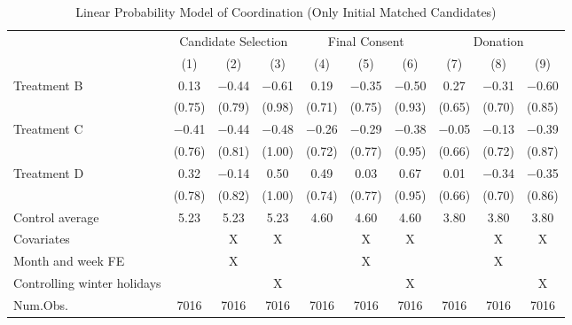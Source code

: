 \documentclass[12pt, a4paper]{article}
\begin{document}
\begin{table}[H]

\caption{\label{tab:lm-coordinate-initial-matched}Linear Probability Model of Coordination (Only Initial Matched Candidates)}
\centering
\fontsize{8}{10}\selectfont
\begin{threeparttable}
\begin{tabular}[t]{lccccccccc}
\toprule
\multicolumn{1}{c}{ } & \multicolumn{3}{c}{Candidate Selection} & \multicolumn{3}{c}{Final Consent} & \multicolumn{3}{c}{Donation} \\
\cmidrule(l{3pt}r{3pt}){2-4} \cmidrule(l{3pt}r{3pt}){5-7} \cmidrule(l{3pt}r{3pt}){8-10}
  & (1) & (2) & (3) & (4) & (5) & (6) & (7) & (8) & (9)\\
\midrule
Treatment B & \num{0.13} & \num{-0.44} & \num{-0.61} & \num{0.19} & \num{-0.35} & \num{-0.50} & \num{0.27} & \num{-0.31} & \num{-0.60}\\
 & (\num{0.75}) & (\num{0.79}) & (\num{0.98}) & (\num{0.71}) & (\num{0.75}) & (\num{0.93}) & (\num{0.65}) & (\num{0.70}) & (\num{0.85})\\
Treatment C & \num{-0.41} & \num{-0.44} & \num{-0.48} & \num{-0.26} & \num{-0.29} & \num{-0.38} & \num{-0.05} & \num{-0.13} & \num{-0.39}\\
 & (\num{0.76}) & (\num{0.81}) & (\num{1.00}) & (\num{0.72}) & (\num{0.77}) & (\num{0.95}) & (\num{0.66}) & (\num{0.72}) & (\num{0.87})\\
Treatment D & \num{0.32} & \num{-0.14} & \num{0.50} & \num{0.49} & \num{0.03} & \num{0.67} & \num{0.01} & \num{-0.34} & \num{-0.35}\\
 & (\num{0.78}) & (\num{0.82}) & (\num{1.00}) & (\num{0.74}) & (\num{0.77}) & (\num{0.95}) & (\num{0.66}) & (\num{0.70}) & (\num{0.86})\\
\midrule
Control average & 5.23 & 5.23 & 5.23 & 4.60 & 4.60 & 4.60 & 3.80 & 3.80 & 3.80\\
Covariates &  & X & X &  & X & X &  & X & X\\
Month and week FE &  & X &  &  & X &  &  & X & \\
Controlling winter holidays &  &  & X &  &  & X &  &  & X\\
Num.Obs. & \num{7016} & \num{7016} & \num{7016} & \num{7016} & \num{7016} & \num{7016} & \num{7016} & \num{7016} & \num{7016}\\
\bottomrule
\end{tabular}
\begin{tablenotes}

\end{tablenotes}
\end{threeparttable}
\end{table}
\end{document}
